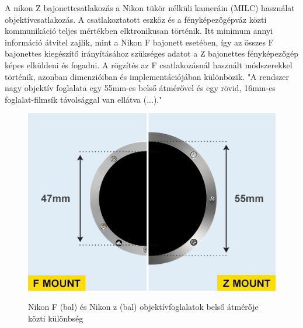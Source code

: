 A nikon Z bajonettcsatlakozás a Nikon tükör nélküli kameráin (MILC) használat objektívcsatlakozás. A csatlakoztatott eszköz és a fényképezőgépváz közti kommunikáció teljes mértékben elktronikusan történik. Itt minimum annyi információ átvitel zajlik, mint a Nikon F bajonett esetében, így az összes F bajonettes kiegészítő irányításához szükséges adatot a Z bajonettes fényképezőgép képes elküldeni és fogadni. A rögzítés az F csatlakozásnál használt módszerekkel történik, azonban dimenzióiban és implementációjában különbözik. "A rendszer nagy objektív foglalata egy 55mm-es belső átmérővel és egy rövid, 16mm-es foglalat-filmsík távolsággal van ellátva (...)."\cite{Nikon_Z}

\begin{figure}[H]
	\centering
	\includegraphics[width=0.5\linewidth]{img/F-mount-vs-Z-mount-illustration.jpg}
    \cite{Nikon_Z}
	\caption{Nikon F (bal) és Nikon z (bal) objektívfoglalatok belső átmérője közti különbség}
	\label{fig:F100_AF_csavar}
\end{figure}